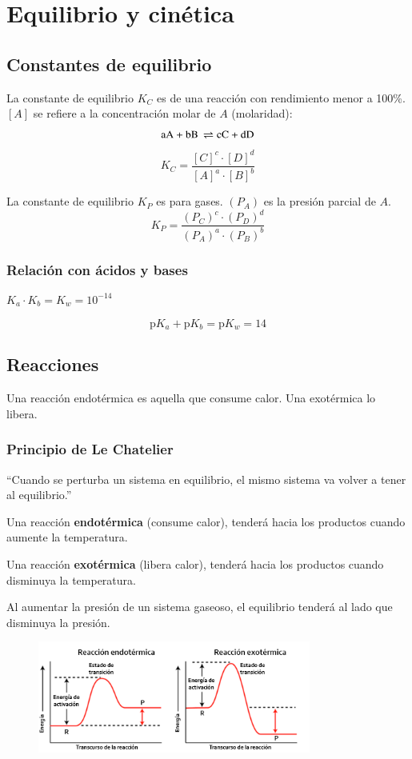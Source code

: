 \section{Equilibrio y cinética}

\subsection*{Constantes de equilibrio}

La constante de equilibrio $K_C$ es de una reacción con rendimiento menor a 100\%. $[A]$ se refiere a la concentración molar de $A$ (molaridad):
$$\ce{
aA + bB \rightleftharpoons cC + dD
}$$
$$
K_C = \dfrac{[C]^c \cdot [D]^d}{[A]^a\cdot [B]^b}
$$

La constante de equilibrio $K_P$ es para gases. $(P_A)$ es la presión parcial de $A$.
$$
K_P = \dfrac{(P_C)^c \cdot (P_D)^d}{(P_A)^a \cdot (P_B)^b}
$$


\subsubsection*{Relación con ácidos y bases}

\hfil$K_a \cdot K_b = K_w = 10^{-14}$\hfil

$$\text{p}K_a + \text{p}K_b = \text{p}K_w = 14$$


\subsection*{Reacciones}

Una reacción endotérmica es aquella que consume calor. Una exotérmica lo libera.

\subsubsection*{Principio de Le Chatelier}

``Cuando se perturba un sistema en equilibrio, el mismo sistema va volver a tener al equilibrio.''

Una reacción \textbf{endotérmica} (consume calor), tenderá hacia los productos cuando aumente la temperatura.

Una reacción \textbf{exotérmica} (libera calor), tenderá hacia los productos cuando disminuya la temperatura.

Al aumentar la presión de un sistema gaseoso, el equilibrio tenderá al lado que disminuya la presión.

\begin{figure}[H]
    \centering
    \includegraphics[width=0.8\textwidth]{Images/energia-activacion.png}
\end{figure}
